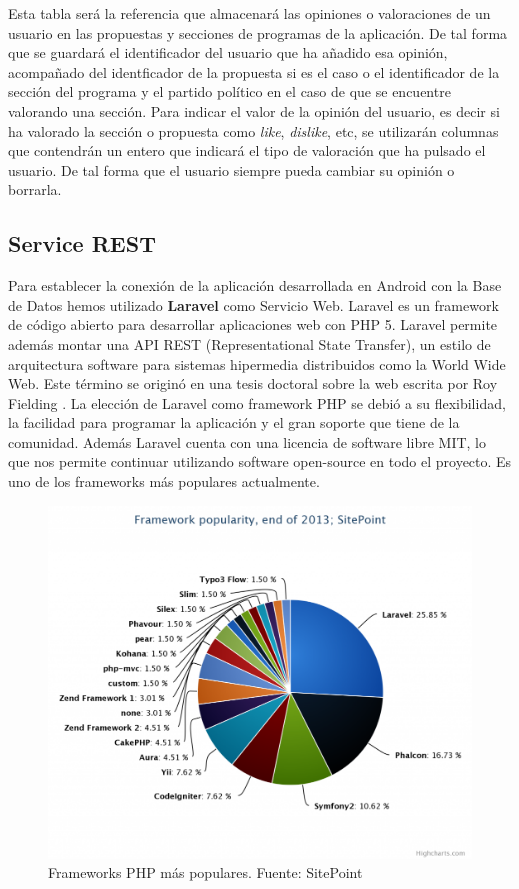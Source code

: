 Esta tabla será la referencia que almacenará las opiniones o valoraciones de un usuario en las propuestas y secciones de programas de la aplicación. De tal forma que se guardará el identificador del usuario que ha añadido esa opinión, acompañado del identficador de la propuesta si es el caso o el identificador de la sección del programa y el partido político en el caso de que se encuentre valorando una sección. Para indicar el valor de la opinión del usuario, es decir si ha valorado la sección o propuesta como \textit{like}, \textit{dislike}, etc, se utilizarán columnas que contendrán un entero que indicará el tipo de valoración que ha pulsado el usuario. De tal forma que el usuario siempre pueda cambiar su opinión o borrarla.

\subsection{Service REST} \label{ssec:seviceREST}

Para establecer la conexión de la aplicación desarrollada en Android con la Base de Datos hemos utilizado \textbf{Laravel} como Servicio Web. Laravel \cite{ref:laravel} es un framework de código abierto para desarrollar aplicaciones web con PHP 5. Laravel permite además montar una API REST (Representational State Transfer), un estilo de arquitectura software para sistemas hipermedia distribuidos como la World Wide Web. Este término se originó en una tesis doctoral sobre la web escrita por Roy Fielding \cite{ref:RESTPhd}. La elección de Laravel como framework PHP se debió a su flexibilidad, la facilidad para programar la aplicación y el gran soporte que tiene de la comunidad. Además Laravel cuenta con una licencia de software libre MIT, lo que nos permite continuar utilizando software open-source en todo el proyecto. Es uno de los frameworks más populares actualmente.

\begin{figure}[H]
\centering
\includegraphics[keepaspectratio, scale=0.30]{Media/Captures/frameworkPopularity.png}
\caption{Frameworks PHP más populares. Fuente: SitePoint}
\label{fig:laravel5popularity}
\end{figure}

